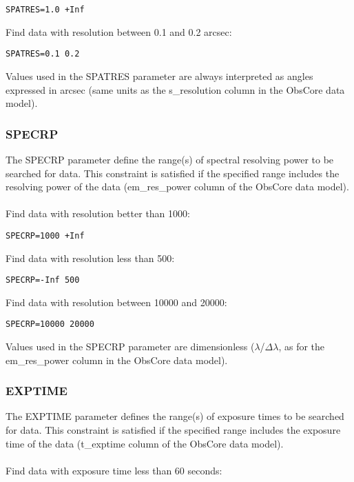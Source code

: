 \documentclass[11pt,a4paper]{ivoa}
\begin{document}
\begin{lstlisting}
SPATRES=1.0 +Inf
\end{lstlisting}
Find data with resolution between 0.1 and 0.2 arcsec:

\begin{lstlisting}
SPATRES=0.1 0.2
\end{lstlisting}

Values used in the SPATRES parameter are always interpreted as angles expressed in arcsec (same units as the s\_resolution column in the ObsCore data model).

\subsubsection{SPECRP}

The SPECRP parameter define the range(s) of spectral resolving power to be searched for data. This constraint is satisfied if the specified range includes the resolving power of the data (em\_res\_power column of the ObsCore data model). \\ \\
Find data with resolution better than 1000:

\begin{lstlisting}
SPECRP=1000 +Inf
\end{lstlisting}
Find data with resolution less than 500:

\begin{lstlisting}
SPECRP=-Inf 500
\end{lstlisting}
Find data with resolution between 10000 and 20000:

\begin{lstlisting}
SPECRP=10000 20000
\end{lstlisting}


Values used in the SPECRP parameter are dimensionless ($\lambda$/$\Delta$$\lambda$, as for the em\_res\_power column in the ObsCore data model).

\subsubsection{EXPTIME}

The EXPTIME parameter defines the range(s) of exposure times to be searched for data. This constraint is satisfied if the specified range includes the exposure time of the data (t\_exptime column of the ObsCore  data model). \\ \\
Find data with exposure time less than  60 seconds:
\end{document}
